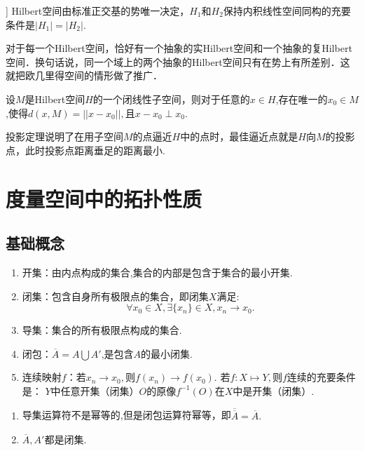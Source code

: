 \documentclass[lang=cn,10pt]{elegantbook}
\begin{document}
	\begin{theorem}[Hilbert空间同构的充要条件[3.6-5]]
		Hilbert空间由标准正交基的势唯一决定，\(H_1\)和\(H_2\)保持内积线性空间同构的充要条件是\(|H_1|=|H_2|.\)
	\end{theorem}
	\begin{note}
		对于每一个Hilbert空间，恰好有一个抽象的实Hilbert空间和一个抽象的复Hilbert空间．换句话说，同一个域上的两个抽象的Hilbert空间只有在势上有所差别．这就把欧几里得空间的情形做了推广．
	\end{note}
	\begin{theorem}[投影定理(T1.3.4)]
		设\(M\)是Hilbert空间\(H\)的一个闭线性子空间，则对于任意的\(x\in H\),存在唯一的\(x_0\in M\),使得\(d(x,M)=||x-x_0||,\)且\(x-x_0 \perp x_0\).
	\end{theorem}
	\begin{note}
		投影定理说明了在用子空间\(M\)的点逼近\(H\)中的点时，最佳逼近点就是\(H\)向\(M\)的投影点，此时投影点距离垂足的距离最小.
	\end{note}
	
	\section{度量空间中的拓扑性质}
	\subsection{基础概念}
	\begin{definition}
		\begin{enumerate}
			\item 开集：由内点构成的集合,集合的内部是包含于集合的最小开集.
			\item 闭集：包含自身所有极限点的集合，即闭集\(X\)满足:
			\[\forall x_0\in X,\exists\{x_n\}\in X,x_n \to x_0.\]
			\item 导集：集合的所有极限点构成的集合.
			\item 闭包：\(\overline{A}=A\bigcup A'\),是包含\(A\)的最小闭集.
			\item 连续映射\(f\)：若\(x_n\to x_0,\)则\(f(x_n)\to f(x_0).\)
			若\(f:X\longmapsto Y,\)则\(f\)连续的充要条件是：
			\(Y\)中任意开集（闭集）\(O\)的原像\(f^{-1}(O)\)在\(X\)中是开集（闭集）.
		\end{enumerate}
	\end{definition}
	\begin{note}
		\begin{enumerate}
			\item 导集运算符不是幂等的,但是闭包运算符幂等，即\(\overline{\overline{A}}=\overline{A}.\)
			\item \(\overline{A},A'\)都是闭集.
		\end{enumerate}
	\end{note}
	
\end{document}
